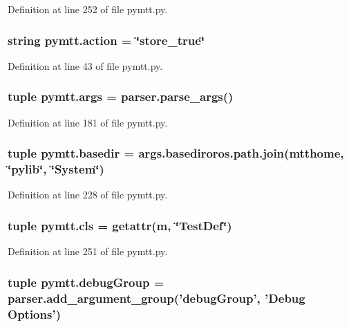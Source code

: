 Definition at line 252 of file pymtt.\-py.

\hypertarget{namespacepymtt_a5ee564a034624d925bb8dc823d11c522}{
\subsubsection[{action}]{\setlength{\rightskip}{0pt plus 5cm}string pymtt.\-action = \char`\"{}store\-\_\-true\char`\"{}}}\label{namespacepymtt_a5ee564a034624d925bb8dc823d11c522}


Definition at line 43 of file pymtt.\-py.

\hypertarget{namespacepymtt_af7633cc372f3357c4f8e6f8dedfe7a8e}{
\subsubsection[{args}]{\setlength{\rightskip}{0pt plus 5cm}tuple pymtt.\-args = parser.\-parse\-\_\-args()}}\label{namespacepymtt_af7633cc372f3357c4f8e6f8dedfe7a8e}


Definition at line 181 of file pymtt.\-py.

\hypertarget{namespacepymtt_a57729393cfbd99464570d7fa5ad9fa05}{
\subsubsection[{basedir}]{\setlength{\rightskip}{0pt plus 5cm}tuple pymtt.\-basedir = args.\-basediroros.\-path.\-join({\bf mtthome}, \char`\"{}pylib\char`\"{}, \char`\"{}System\char`\"{})}}\label{namespacepymtt_a57729393cfbd99464570d7fa5ad9fa05}


Definition at line 228 of file pymtt.\-py.

\hypertarget{namespacepymtt_a17f658b5d141d51664bb3ede8830c4c0}{
\subsubsection[{cls}]{\setlength{\rightskip}{0pt plus 5cm}tuple pymtt.\-cls = getattr({\bf m}, \char`\"{}Test\-Def\char`\"{})}}\label{namespacepymtt_a17f658b5d141d51664bb3ede8830c4c0}


Definition at line 251 of file pymtt.\-py.

\hypertarget{namespacepymtt_af066a010075617c13a5595243ceb9041}{
\subsubsection[{debug\-Group}]{\setlength{\rightskip}{0pt plus 5cm}tuple pymtt.\-debug\-Group = parser.\-add\-\_\-argument\-\_\-group('debug\-Group', 'Debug Options')}}\label{namespacepymtt_af066a010075617c13a5595243ceb9041}


